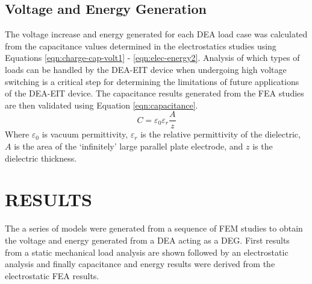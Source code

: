 \subsection{Voltage and Energy Generation}
The voltage increase and energy generated for each DEA load case was calculated from the capacitance values determined in the electrostatics studies using Equations \ref{eqn:charge-cap-volt1} - \ref{eqn:elec-energy2}. Analysis of which types of loads can be handled by the DEA-EIT device when undergoing high voltage switching is a critical step for determining the limitations of future applications of the DEA-EIT device. The capacitance results generated from the FEA studies are then validated using Equation \ref{eqn:capacitance}.
\begin{equation}
	C = \varepsilon_0 \varepsilon_r \frac{A}{z}
	\label{eqn:capacitance}
\end{equation}
Where $\varepsilon_0$ is vacuum permittivity, $\varepsilon_r$ is the relative permittivity of the dielectric, $A$ is the area of the `infinitely' large parallel plate electrode, and $z$ is the dielectric thickness.


\section{RESULTS}
\label{sec:results}
The a series of models were generated from a sequence of FEM studies to obtain the voltage and energy generated from a DEA acting as a DEG. First results from a static mechanical load analysis are shown followed by an electrostatic analysis and finally capacitance and energy results were derived from the electrostatic FEA results.


